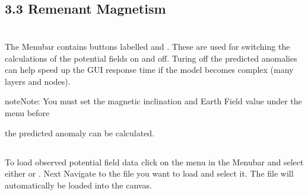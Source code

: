 \documentclass[a4paper,12pt,english]{sphinxmanual}
\begin{document}
\begin{DUlineblock}{0em}
\item[] 
\end{DUlineblock}


\subsection{3.3 Remenant Magnetism}
\label{\detokenize{manual__layer_attributes:remenant-magnetism}}

\section{}
\label{\detokenize{manual__PF::doc}}\label{\detokenize{manual__PF:potential-field-data}}
\begin{DUlineblock}{0em}
\item[] 
\end{DUlineblock}


\subsection{}
\label{\detokenize{manual__PF:potential-field-calculations}}
The Menubar contains buttons labelled  and .
These are used for switching the calculations of the potential fields on and off. Turing off the predicted anomalies
can help speed up the GUI response time if the model becomes complex (many layers and nodes).

\begin{sphinxadmonition}{note}{Note:}
You must set the magnetic inclination and Earth Field value under the  menu before
\end{sphinxadmonition}

the predicted anomaly can be calculated.

\begin{DUlineblock}{0em}
\item[] 
\end{DUlineblock}


\subsection{}
\label{\detokenize{manual__PF:loading-observed-potential-field-data}}
To load observed potential field data click on the  menu in the Menubar and select either
 or .
Next Navigate to the file you want to load and select it.
The file will automatically be loaded into the canvas.
\end{document}
